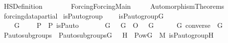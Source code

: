 %
\begin{isabellebody}%
%
%
\isadelimtheory
%
\endisadelimtheory
%
\isatagtheory
{}\isamarkupfalse%
\ HS{\isacharunderscore}{\kern0pt}Definition\isanewline
\ \ \ \isanewline
\ \ \ \ {\isachardoublequoteopen}Forcing{\isacharslash}{\kern0pt}Forcing{\isacharunderscore}{\kern0pt}Main{\isachardoublequoteclose}\ \isanewline
\ \ \ \ Automorphism{\isacharunderscore}{\kern0pt}Theorems\isanewline
{}%
\endisatagtheory
{\isafoldtheory}%
%
\isadelimtheory
\ \isanewline
%
\endisadelimtheory
\isanewline
{}\isamarkupfalse%
\ forcing{\isacharunderscore}{\kern0pt}data{\isacharunderscore}{\kern0pt}partial\isanewline
{}\isanewline
\isanewline
{}\isamarkupfalse%
\ is{\isacharunderscore}{\kern0pt}P{\isacharunderscore}{\kern0pt}auto{\isacharunderscore}{\kern0pt}group\ \ \isanewline
\ \ {\isachardoublequoteopen}is{\isacharunderscore}{\kern0pt}P{\isacharunderscore}{\kern0pt}auto{\isacharunderscore}{\kern0pt}group{\isacharparenleft}{\kern0pt}G{\isacharparenright}{\kern0pt}\ {\isasymequiv}\ \isanewline
\ \ \ \ G\ {\isasymsubseteq}\ {\isacharbraceleft}{\kern0pt}\ {\isasympi}\ {\isasymin}\ P\ {\isasymrightarrow}\ P{\isachardot}{\kern0pt}\ is{\isacharunderscore}{\kern0pt}P{\isacharunderscore}{\kern0pt}auto{\isacharparenleft}{\kern0pt}{\isasympi}{\isacharparenright}{\kern0pt}\ {\isacharbraceright}{\kern0pt}\ \isanewline
\ \ {\isasymand}\ {\isacharparenleft}{\kern0pt}{\isasymforall}{\isasympi}\ {\isasymin}\ G{\isachardot}{\kern0pt}\ {\isasymforall}{\isasymtau}\ {\isasymin}\ G{\isachardot}{\kern0pt}\ {\isasympi}\ O\ {\isasymtau}\ {\isasymin}\ G{\isacharparenright}{\kern0pt}\ \isanewline
\ \ {\isasymand}\ {\isacharparenleft}{\kern0pt}{\isasymforall}{\isasympi}\ {\isasymin}\ G{\isachardot}{\kern0pt}\ converse{\isacharparenleft}{\kern0pt}{\isasympi}{\isacharparenright}{\kern0pt}\ {\isasymin}\ G{\isacharparenright}{\kern0pt}{\isachardoublequoteclose}\ \ \ \isanewline
\isanewline
{}\isamarkupfalse%
\ P{\isacharunderscore}{\kern0pt}auto{\isacharunderscore}{\kern0pt}subgroups\ \ {\isachardoublequoteopen}P{\isacharunderscore}{\kern0pt}auto{\isacharunderscore}{\kern0pt}subgroups{\isacharparenleft}{\kern0pt}G{\isacharparenright}{\kern0pt}\ {\isasymequiv}\ {\isacharbraceleft}{\kern0pt}\ H\ {\isasymin}\ Pow{\isacharparenleft}{\kern0pt}G{\isacharparenright}{\kern0pt}\ {\isasyminter}\ M{\isachardot}{\kern0pt}\ is{\isacharunderscore}{\kern0pt}P{\isacharunderscore}{\kern0pt}auto{\isacharunderscore}{\kern0pt}group{\isacharparenleft}{\kern0pt}H{\isacharparenright}{\kern0pt}\ {\isacharbraceright}{\kern0pt}{\isachardoublequoteclose}\ \isanewline

\end{isabellebody}
